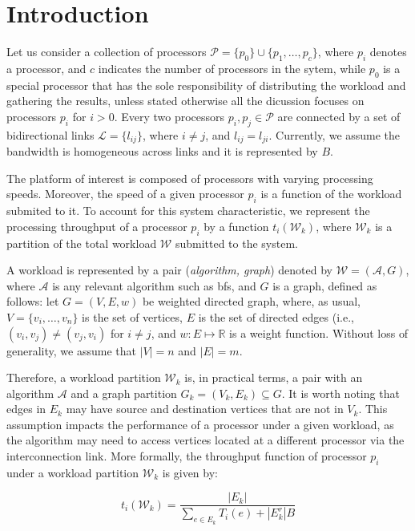 \section{Introduction}
\label{sec:intro}
Let us consider a collection of processors $\mathcal{P} = \{p_0\} \cup \{p_1,\ldots,p_c\}$, where $p_i$ denotes a processor, and $c$ indicates the number of processors in the sytem, while $p_0$ is a special processor that has the sole responsibility of distributing the workload and gathering the results, unless stated otherwise all the dicussion focuses on processors $p_i$ for $i>0$. Every two processors $p_i,p_j \in \mathcal{P}$ are connected by a set of bidirectional links $\mathcal{L} = \{l_{ij}\}$, where $i \neq j$, and $l_{ij} = l_{ji}$. Currently, we assume the bandwidth is homogeneous across links and it is represented by $B$.

The platform of interest is composed of processors with varying processing speeds. Moreover, the speed of a given processor $p_i$ is a function of the workload submited to it. To account for this system characteristic, we represent the processing throughput of a processor $p_i$ by a function $t_i(\mathcal{W}_k)$, where $\mathcal{W}_k$ is a partition of the total workload $\mathcal{W}$ submitted to the system. 

A workload is represented by a pair ({\em algorithm, graph}) denoted by $\mathcal{W} = (\mathcal{A}, G)$, where $\mathcal{A}$ is any relevant algorithm such as {\sc bfs}, and $G$ is a graph, defined as follows: let $G = (V, E, w)$ be weighted directed graph, where, as usual, $V = \{v_i, \ldots,v_n\}$ is the set of vertices, $E$ is the set of directed edges (i.e., $(v_i,v_j) \neq (v_j, v_i)$ for $i \neq j$, and $w: E \mapsto \mathbb{R}$ is a weight function. Without loss of generality, we assume that $|V| = n$ and $|E| = m$.

Therefore, a workload partition $\mathcal{W}_k$ is, in practical terms, a pair with an algorithm $\mathcal{A}$ and a graph partition $G_k = (V_k, E_k) \subseteq G$. It is worth noting that edges in $E_k$ may have source and destination vertices that are not in $V_k$. This assumption impacts the performance of a processor under a given workload, as the algorithm may need to access vertices located at a different processor via the interconnection link. More formally, the throughput function of processor $p_i$ under a workload partition $\mathcal{W}_k$ is given by:

\begin{equation}
t_i(\mathcal{W}_k) = \frac{|E_k|}{\sum_{e \in E_k}T_i(e) + |E_k^{r}|B}
\end{equation}\label{eq:throughput_p}


